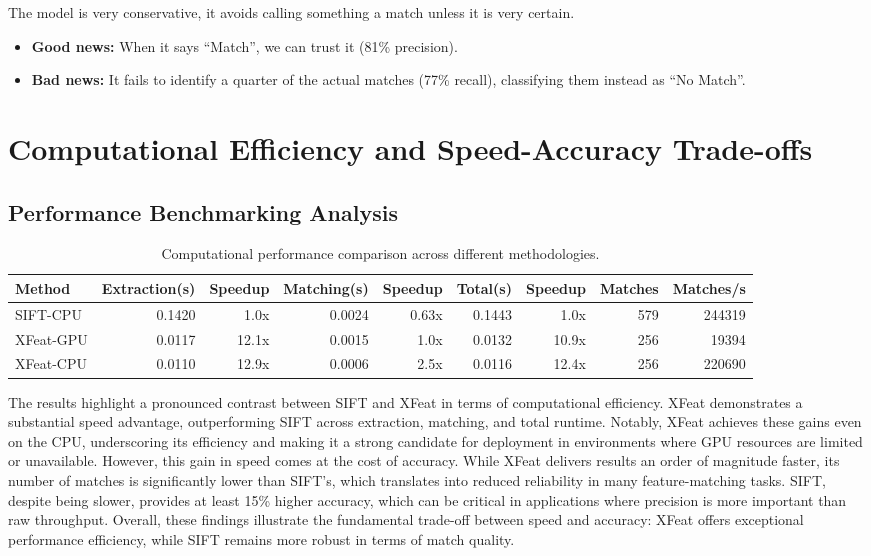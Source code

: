 The model is very conservative, it avoids calling something a match unless it is very certain.

\begin{itemize}
    \item \textbf{Good news:} When it says ``Match'', we can trust it (81\% precision).
    \item \textbf{Bad news:} It fails to identify a quarter of the actual matches (77\% recall), classifying them instead as ``No Match''.
\end{itemize}

\section{Computational Efficiency and Speed-Accuracy Trade-offs}

\subsection{Performance Benchmarking Analysis}

\begin{table}[H]
\centering
\caption{Computational performance comparison across different methodologies.}
\label{tab:speed_comparison}
\begin{tabular}{l r r r r r r r r}
    \toprule
    Method    & Extraction(s) & Speedup & Matching(s) & Speedup & Total(s) & Speedup & Matches & Matches/s \\
    \midrule
    SIFT-CPU  & 0.1420        & 1.0x     & 0.0024      & 0.63x    & 0.1443   & 1.0x     & 579     & 244319    \\
    XFeat-GPU & 0.0117        & 12.1x    & 0.0015      & 1.0x     & 0.0132   & 10.9x    & 256     & 19394     \\
    XFeat-CPU & 0.0110        & 12.9x    & 0.0006      & 2.5x     & 0.0116   & 12.4x    & 256     & 220690    \\
    \bottomrule
\end{tabular}
\end{table}

The results highlight a pronounced contrast between SIFT and XFeat in terms of computational efficiency. XFeat demonstrates a substantial speed advantage, outperforming SIFT across extraction, matching, and total runtime. Notably, XFeat achieves these gains even on the CPU, underscoring its efficiency and making it a strong candidate for deployment in environments where GPU resources are limited or unavailable. However, this gain in speed comes at the cost of accuracy. While XFeat delivers results an order of magnitude faster, its number of matches is significantly lower than SIFT's, which translates into reduced reliability in many feature-matching tasks. SIFT, despite being slower, provides at least 15\% higher accuracy, which can be critical in applications where precision is more important than raw throughput. Overall, these findings illustrate the fundamental trade-off between speed and accuracy: XFeat offers exceptional performance efficiency, while SIFT remains more robust in terms of match quality.
